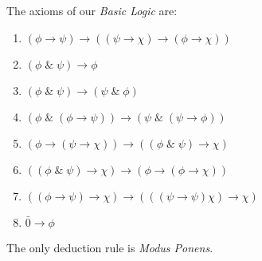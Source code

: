  \begin{definition}  The axioms of our \emph{Basic Logic} are:
 	\begin{enumerate}[label=(A\arabic*)]
 		\item $(\phi \rightarrow \psi)\rightarrow((\psi \rightarrow \chi)\rightarrow(\phi \rightarrow \chi))$
 		\item $(\phi \; \& \; \psi)\rightarrow \phi $
 		\item $(\phi \; \& \; \psi)\rightarrow (\psi \; \& \; \phi) $
 		\item $(\phi \; \& \; (\phi \rightarrow \psi))\rightarrow (\psi \; \& \; (\psi \rightarrow \phi)) $
 		\item $ (\phi \rightarrow (\psi \rightarrow \chi)) \rightarrow ((\phi \; \& \; \psi) \rightarrow \chi) $
 		\item $ ((\phi \; \& \; \psi) \rightarrow \chi) \rightarrow (\phi \rightarrow (\phi \rightarrow \chi)) $
 		\item $((\phi \rightarrow \psi)\rightarrow \chi)\rightarrow(((\psi \rightarrow \psi)\chi)\rightarrow \chi) $
 		\item $\bar{0} \rightarrow \phi $ 
 	\end{enumerate}
 \end{definition}
 The only deduction rule is \emph{Modus Ponens}.\newline
 
